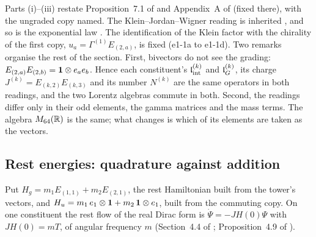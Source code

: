 Parts (i)--(iii) restate Proposition~7.1 of \cite{RE} and Appendix~A of \cite{ES17} (fixed there), with the ungraded copy named. The
Klein--Jordan--Wigner reading is inherited \cite{JordanWigner28,Klein38}, and so is the exponential law \cite{Chevalley54,LawsonMichelsohn89}. The
identification of the Klein factor with the chirality of the first copy, $u_a=\Gamma^{(1)}E_{(2,a)}$, is fixed (e1-1a to e1-1d). Two
remarks organise the rest of the section. First, bivectors do not see the grading: $E_{(2,a)}E_{(2,b)}=\mathbf 1\otimes e_ae_b$. Hence each
constituent's $\mathfrak l_{\rm int}^{(k)}$ and $\mathfrak l_G^{(k)}$, its charge $J^{(k)}=E_{(k,2)}E_{(k,3)}$ and its number $N^{(k)}$ are the same operators in both
readings, and the two Lorentz algebras commute in both. Second, the readings differ only in their odd elements, the gamma matrices and
the mass terms. The algebra $M_{64}(\mathbb{R})$ is the same; what changes is which of its elements are taken as the vectors.

\subsection{Rest energies: quadrature against addition}
\label{e1:sec:rest}

Put $H_g=m_1E_{(1,1)}+m_2E_{(2,1)}$, the rest Hamiltonian built from the tower's vectors, and $H_u=m_1\,e_1\otimes\mathbf 1+m_2\,\mathbf 1\otimes e_1$,
built from the commuting copy. On one constituent the rest flow of the real Dirac form is $\dot\Psi=-JH(0)\Psi$ with $JH(0)=mT$, of angular
frequency $m$ (Section~4.4 of \cite{ES17}; Proposition~4.9 of \cite{RE}).


